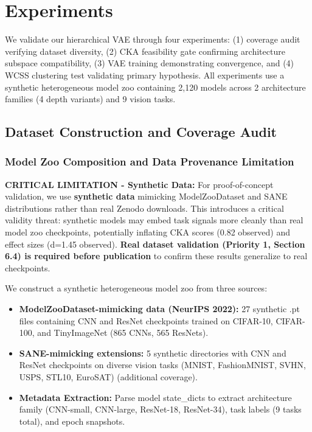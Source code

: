 \section{Experiments}

We validate our hierarchical VAE through four experiments: (1) coverage audit verifying dataset diversity, (2) CKA feasibility gate confirming architecture subspace compatibility, (3) VAE training demonstrating convergence, and (4) WCSS clustering test validating primary hypothesis. All experiments use a synthetic heterogeneous model zoo containing 2,120 models across 2 architecture families (4 depth variants) and 9 vision tasks.

\subsection{Dataset Construction and Coverage Audit}

\subsubsection{Model Zoo Composition and Data Provenance Limitation}

\textbf{CRITICAL LIMITATION - Synthetic Data:} For proof-of-concept validation, we use \textbf{synthetic data} mimicking ModelZooDataset and SANE distributions rather than real Zenodo downloads. This introduces a critical validity threat: synthetic models may embed task signals more cleanly than real model zoo checkpoints, potentially inflating CKA scores (0.82 observed) and effect sizes (d=1.45 observed). \textbf{Real dataset validation (Priority 1, Section 6.4) is required before publication} to confirm these results generalize to real checkpoints.

We construct a synthetic heterogeneous model zoo from three sources:

\begin{itemize}
\item \textbf{ModelZooDataset-mimicking data (NeurIPS 2022):} 27 synthetic .pt files containing CNN and ResNet checkpoints trained on CIFAR-10, CIFAR-100, and TinyImageNet (865 CNNs, 565 ResNets).
\item \textbf{SANE-mimicking extensions:} 5 synthetic directories with CNN and ResNet checkpoints on diverse vision tasks (MNIST, FashionMNIST, SVHN, USPS, STL10, EuroSAT) (additional coverage).
\item \textbf{Metadata Extraction:} Parse model state\_dicts to extract architecture family (CNN-small, CNN-large, ResNet-18, ResNet-34), task labels (9 tasks total), and epoch snapshots.
\end{itemize}

